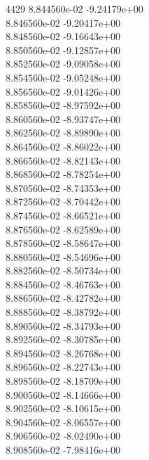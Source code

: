 4429	8.844560e-02	-9.24179e+00	\\ 	8.846560e-02	-9.20417e+00	\\ 	8.848560e-02	-9.16643e+00	\\ 	8.850560e-02	-9.12857e+00	\\ 	8.852560e-02	-9.09058e+00	\\ 	8.854560e-02	-9.05248e+00	\\ 	8.856560e-02	-9.01426e+00	\\ 	8.858560e-02	-8.97592e+00	\\ 	8.860560e-02	-8.93747e+00	\\ 	8.862560e-02	-8.89890e+00	\\ 	8.864560e-02	-8.86022e+00	\\ 	8.866560e-02	-8.82143e+00	\\ 	8.868560e-02	-8.78254e+00	\\ 	8.870560e-02	-8.74353e+00	\\ 	8.872560e-02	-8.70442e+00	\\ 	8.874560e-02	-8.66521e+00	\\ 	8.876560e-02	-8.62589e+00	\\ 	8.878560e-02	-8.58647e+00	\\ 	8.880560e-02	-8.54696e+00	\\ 	8.882560e-02	-8.50734e+00	\\ 	8.884560e-02	-8.46763e+00	\\ 	8.886560e-02	-8.42782e+00	\\ 	8.888560e-02	-8.38792e+00	\\ 	8.890560e-02	-8.34793e+00	\\ 	8.892560e-02	-8.30785e+00	\\ 	8.894560e-02	-8.26768e+00	\\ 	8.896560e-02	-8.22743e+00	\\ 	8.898560e-02	-8.18709e+00	\\ 	8.900560e-02	-8.14666e+00	\\ 	8.902560e-02	-8.10615e+00	\\ 	8.904560e-02	-8.06557e+00	\\ 	8.906560e-02	-8.02490e+00	\\ 	8.908560e-02	-7.98416e+00	\\ \hline
